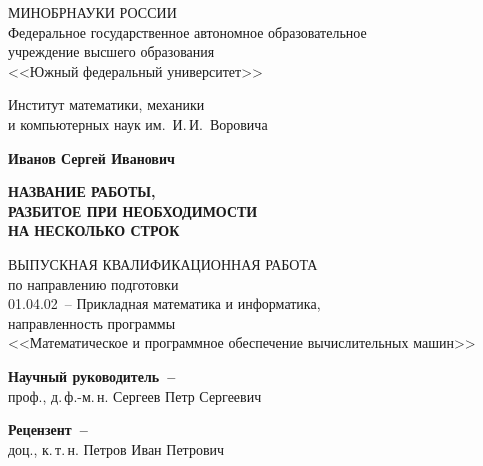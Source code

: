 


\thispagestyle{empty}
\begin{singlespacing} 
\begin{center}

МИНОБРНАУКИ РОССИИ\\ [12pt]
Федеральное государственное автономное образовательное\\
учреждение высшего образования\\
<<Южный федеральный университет>>

\vspace{\baselineskip}
Институт математики, механики\\
и компьютерных наук им.~И.\,И.~Воровича


\vfill
\textbf{Иванов Сергей Иванович}

\vspace{15mm}
{\bf НАЗВАНИЕ РАБОТЫ, \\
РАЗБИТОЕ ПРИ НЕОБХОДИМОСТИ \\
НА НЕСКОЛЬКО СТРОК }

\vspace{15mm}
ВЫПУСКНАЯ КВАЛИФИКАЦИОННАЯ РАБОТА\\
по направлению подготовки\\
01.04.02~-- Прикладная математика и информатика,\\
направленность программы\\
<<Математическое и программное обеспечение вычислительных машин>>

\vspace{10mm}
\textbf{Научный руководитель~--}\\
проф., д.\,ф.-м.\,н. Сергеев Петр Сергеевич

\vspace{7mm}
\textbf{Рецензент~--}\\
доц., к.\,т.\,н. Петров Иван Петрович



\end{center}
\end{singlespacing}
